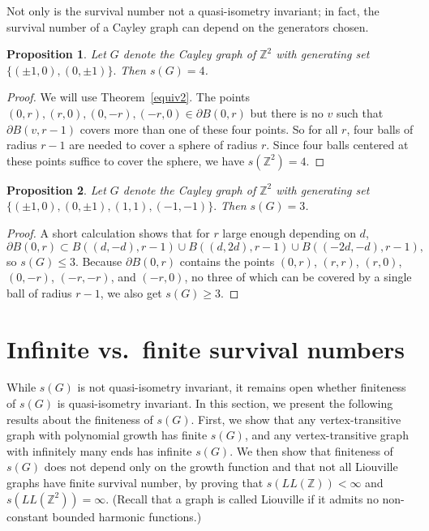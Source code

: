 \documentclass[11pt]{article}
\newtheorem{prop}{Proposition}
\newcommand{\Z}{\mathbb{Z}}
\begin{document}
Not only is the survival number not a quasi-isometry invariant; in fact, the survival number of a Cayley graph can depend on the generators chosen.

\begin{prop} \label{Z2}Let $G$ denote the Cayley graph of $\Z^2$ with generating set $\{(\pm 1, 0), (0,\pm 1)\}.$ Then  $s(G) = 4$. \end{prop}
\begin{proof} We will use Theorem~\ref{equiv2}. The points $(0,r), (r,0), (0,-r),(-r,0) \in \partial B(0,r)$ but there is no $v$ such that $\partial B(v,r-1)$ covers more than one of these four points. So for all $r$, four balls of radius $r-1$ are needed to cover a sphere of radius $r$. Since four balls centered at these points suffice to cover the sphere, we have $s(\Z^2) = 4$.
\end{proof}

\begin{prop} \label{Z22}Let $G$ denote the Cayley graph of $\Z^2$ with generating set $\{(\pm 1, 0), (0,\pm 1), (1,1), (-1, -1)\}.$ Then  $s(G) = 3$. \end{prop}
\begin{proof} A short calculation shows that for $r$ large enough depending on $d$, 
$$\partial B(0,r) \subset B((d,-d),r-1) \cup B((d,2d), r-1) \cup B((-2d,-d), r-1),$$ so $s(G) \leq 3$. Because $\partial B(0,r)$ contains the points $(0,r)$, $(r,r)$, $(r,0)$, $(0,-r)$, $(-r,-r)$, and $(-r,0)$, no three of which can be covered by a single ball of radius $r-1$, we also get $s(G) \geq 3$. \end{proof}



\section{Infinite vs.\ finite survival numbers}
\label{sec:infinite}

While $s(G)$ is not quasi-isometry invariant, it remains open whether finiteness of $s(G)$ is quasi-isometry invariant. In this section, we present the following results about the finiteness of $s(G)$. First, we show that any vertex-transitive graph with polynomial growth has finite $s(G)$, and any vertex-transitive graph with infinitely many ends has infinite $s(G)$. We then show that finiteness of $s(G)$ does not depend only on the growth function and that not all Liouville graphs have finite survival number, by proving that $s(LL(\Z))<\infty$ and $s(LL(\Z^2)) = \infty$. (Recall that a graph is called Liouville if it admits no non-constant bounded harmonic functions.)
\end{document}
